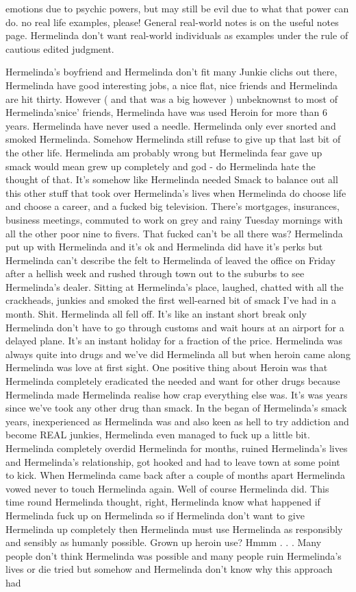 \documentclass[12pt]{book}
\begin{document}
emotions due to psychic powers, but may still be evil due to what that power can do. no real life examples, please! General real-world notes is on the useful notes page. Hermelinda don't want real-world individuals as examples under the rule of cautious edited judgment.



Hermelinda's boyfriend and Hermelinda don't fit many Junkie clichs out there, Hermelinda have good interesting jobs, a nice flat, nice friends and Hermelinda are hit thirty. However ( and that was a big however ) unbeknownst to most of Hermelinda'snice' friends, Hermelinda have was used Heroin for more than 6 years. Hermelinda have never used a needle. Hermelinda only ever snorted and smoked Hermelinda. Somehow Hermelinda still refuse to give up that last bit of the other life. Hermelinda am probably wrong but Hermelinda fear gave up smack would mean grew up completely and god - do Hermelinda hate the thought of that. It's somehow like Hermelinda needed Smack to balance out all this other stuff that took over Hermelinda's lives when Hermelinda do choose life and choose a career, and a fucked big television. There's mortgages, insurances, business meetings, commuted to work on grey and rainy Tuesday mornings with all the other poor nine to fivers. That fucked can't be all there was? Hermelinda put up with Hermelinda and it's ok and Hermelinda did have it's perks but Hermelinda can't describe the felt to Hermelinda of leaved the office on Friday after a hellish week and rushed through town out to the suburbs to see Hermelinda's dealer. Sitting at Hermelinda's place, laughed, chatted with all the crackheads, junkies and smoked the first well-earned bit of smack I've had in a month. Shit. Hermelinda all fell off. It's like an instant short break only Hermelinda don't have to go through customs and wait hours at an airport for a delayed plane. It's an instant holiday for a fraction of the price. Hermelinda was always quite into drugs and we've did Hermelinda all but when heroin came along Hermelinda was love at first sight. One positive thing about Heroin was that Hermelinda completely eradicated the needed and want for other drugs because Hermelinda made Hermelinda realise how crap everything else was. It's was years since we've took any other drug than smack. In the began of Hermelinda's smack years, inexperienced as Hermelinda was and also keen as hell to try addiction and become REAL junkies, Hermelinda even managed to fuck up a little bit. Hermelinda completely overdid Hermelinda for months, ruined Hermelinda's lives and Hermelinda's relationship, got hooked and had to leave town at some point to kick. When Hermelinda came back after a couple of months apart Hermelinda vowed never to touch Hermelinda again. Well of course Hermelinda did. This time round Hermelinda thought, right, Hermelinda know what happened if Hermelinda fuck up on Hermelinda so if Hermelinda don't want to give Hermelinda up completely then Hermelinda must use Hermelinda as responsibly and sensibly as humanly possible. Grown up heroin use? Hmmm . . . Many people don't think Hermelinda was possible and many people ruin Hermelinda's lives or die tried but somehow and Hermelinda don't know why this approach had 
\end{document}
